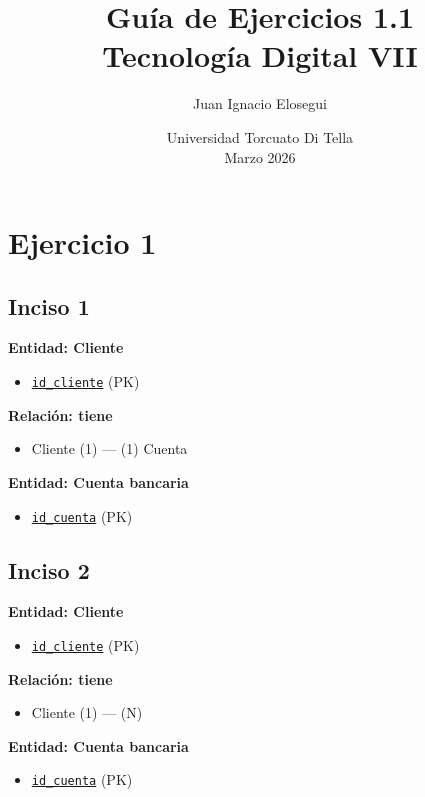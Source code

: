 \documentclass[a4paper,12pt]{article}
\title{\vspace{-2cm}\textbf{Guía de Ejercicios 1.1}\\[0.2cm]
\large Tecnología Digital VII}
\author{Juan Ignacio Elosegui}
\date{Universidad Torcuato Di Tella \\ Marzo 2026}
\begin{document}
    \maketitle
    \section*{Ejercicio 1}
        \subsection*{Inciso 1}
            \textbf{Entidad: Cliente}
                \begin{itemize}
                    \item \underline{\texttt{id\_cliente}} (PK)
                \end{itemize}

            \textbf{Relación: tiene}
                \begin{itemize}
                    \item Cliente (1) --- (1) Cuenta
                \end{itemize}

            \textbf{Entidad: Cuenta bancaria}
                \begin{itemize}
                    \item \underline{\texttt{id\_cuenta}} (PK)
                \end{itemize}

       \subsection*{Inciso 2}
            \textbf{Entidad: Cliente}
                \begin{itemize}
                    \item \underline{\texttt{id\_cliente}} (PK)
                \end{itemize}

            \textbf{Relación: tiene}
                \begin{itemize}
                    \item Cliente (1) --- (N)
                \end{itemize}

            \textbf{Entidad: Cuenta bancaria}
                \begin{itemize}
                    \item \underline{\texttt{id\_cuenta}} (PK)
                \end{itemize}
            
\end{document}
